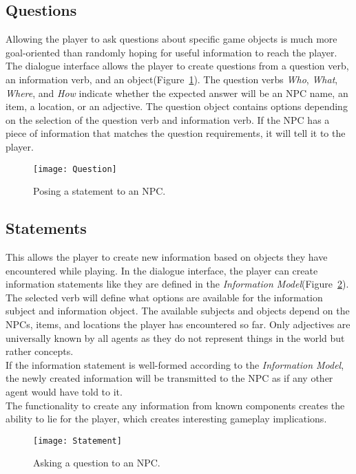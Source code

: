 \subsection{Questions}
Allowing the player to ask questions about specific game objects is much more goal-oriented than randomly hoping for useful information to reach the player. The dialogue interface allows the player to create questions from a question verb, an information verb, and an object(Figure~\ref{fig:question}). The question verbs \textit{Who}, \textit{What}, \textit{Where}, and \textit{How} indicate whether the expected answer will be an NPC name, an item, a location, or an adjective. The question object contains options depending on the selection of the question verb and information verb. If the NPC has a piece of information that matches the question requirements, it will tell it to the player.
\begin{figure}
	\centering
	\texttt{[image: Question]}
	\caption{Posing a statement to an NPC.}
	\label{fig:question}
\end{figure}
\subsection{Statements}
This allows the player to create new information based on objects they have encountered while playing. In the dialogue interface, the player can create information statements like they are defined in the \textit{Information Model}(Figure~\ref{fig:statement}). The selected verb will define what options are available for the information subject and information object. The available subjects and objects depend on the NPCs, items, and locations the player has encountered so far. Only adjectives are universally known by all agents as they do not represent things in the world but rather concepts.\\
If the information statement is well-formed according to the \textit{Information Model}, the newly created information will be transmitted to the NPC as if any other agent would have told to it.\\
The functionality to create any information from known components creates the ability to lie for the player, which creates interesting gameplay implications.
\begin{figure}
	\centering
	\texttt{[image: Statement]}
	\caption{Asking a question to an NPC.}
	\label{fig:statement}
\end{figure}
